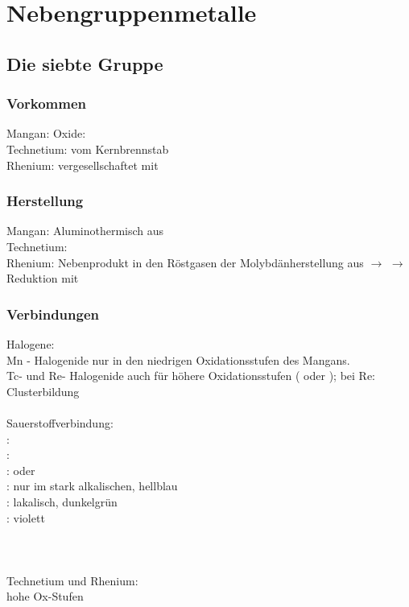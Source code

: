\documentclass[a4paper, fleqn]{article}
\begin{document}
\tableofcontents
\newpage
\section{Nebengruppenmetalle}
\subsection{Die siebte Gruppe}
\subsubsection{Vorkommen}
Mangan: Oxide: \\
Technetium: vom Kernbrennstab\\
Rhenium: vergesellschaftet mit 
\subsubsection{Herstellung}
Mangan: Aluminothermisch aus \\
Technetium: \\
Rhenium: Nebenprodukt in den Röstgasen der Molybdänherstellung aus  $\rightarrow$  $\rightarrow$ Reduktion mit 

\subsubsection{Verbindungen}
Halogene:\\
Mn - Halogenide nur in den niedrigen Oxidationsstufen des Mangans.\\
Tc- und Re- Halogenide auch für höhere Oxidationsstufen ( oder ); bei Re: Clusterbildung\\\\
Sauerstoffverbindung:\\
: \\
: \\
:  oder \\
:  nur im stark alkalischen, hellblau\\
:  lakalisch, dunkelgrün\\
:  violett\\
\vspace*{2cm} \\
\vspace*{3cm} \\\\
Technetium und Rhenium:\\
hohe Ox-Stufen \\
\end{document}

